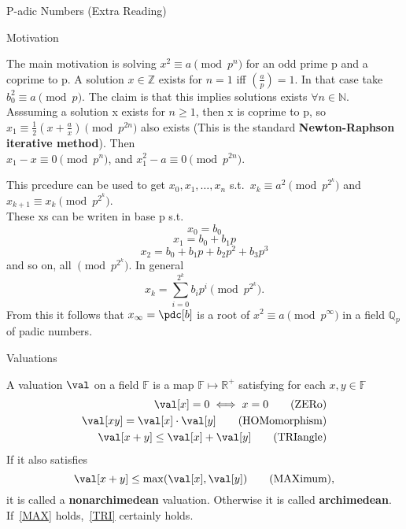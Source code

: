 \documentclass[12pt, letterpaper]{article}
\newcommand{\R}{\mathbb{R}}
\newcommand{\Q}{\mathbb{Q}}
\newcommand{\Z}{\mathbb{Z}}
\newcommand{\F}{\mathbb{F}}
\newcommand{\N}{\mathbb{N}}
\begin{document}
\newpage

\begin{section}{P-adic Numbers (Extra Reading)}

  \begin{subsection}{Motivation}

    The main motivation is solving \(x^{2} \equiv a \pmod{p^{n}}\) for an odd
    prime p and a coprime to p. A solution \(x \in \Z\) exists for \(n = 1\) iff
    \((\frac{a}{p}) = 1\). In that case take \(b^{2}_{0} \equiv a \pmod{p}\).
    The claim is that this implies solutions exists \(\forall n \in \N\). \\
    Asssuming a solution x exists for \(n \geq 1\), then x is coprime to p, so
    \(x_{1} \equiv \frac{1}{2} (x + \frac{a}{x}) \pmod{p^{2n}}\) also exists
    (This is the standard \textbf{Newton-Raphson iterative method}). Then \\
    \(x_{1} - x \equiv 0 \pmod{p^{n}}\), and \(x^{2}_{1} - a \equiv 0
    \pmod{p^{2n}}\).

    This prcedure can be used to get \(x_{0}, x_{1}, \dots , x_{n}\) s.t.\
    \(x_{k} \equiv a^{2} \pmod{p^{2^{k}}}\) and \(x_{k + 1} \equiv x_{k}
    \pmod{p^{2^{k}}}\). \\
    These xs can be writen in base p s.t.\
    \[x_{0} = b_{0}\] \[x_{1} = b_{0} + b_{1} p\]
    \[x_{2} = b_{0} + b_{1} p + b_{2} p^{2} + b_{3} p^{3}\]
    and so on, all \(\pmod{p^{2^{k}}}\). In general
    \[x_{k} = \sum^{2^{k}}_{i = 0} b_{i}p^{i} \pmod{p^{2^{k}}}.\]
    From this it follows that \(x_{\infty} = \pdc[b]\)
    is a root of \(x^{2} \equiv a \pmod{p^{\infty}}\) in a field \(\Q_{p}\) of
    padic numbers.

  \end{subsection}

  \begin{subsection}{Valuations}

    A valuation \(\val\) on a field \(\F\) is a map \(\F \mapsto \R^{+}\)
    satisfying for each \(x, y \in \F\)
    \begin{align*}
      \val[x] = 0 \iff x = 0 \tag{ZERo} \label{ZER} \\
      \val[xy] = \val[x] \cdot \val[y] \tag{HOMomorphism} \label{HOM} \\
      \val[x + y] \leq \val[x] + \val[y] \tag{TRIangle} \label{TRI}
    \end{align*}
    If it also satisfies \[\val[x + y] \leq \max(\val[x], \val[y]) \label{MAX}
      \tag{MAXimum},\] it is called a \textbf{nonarchimedean} valuation.
    Otherwise it is called \textbf{archimedean}. If~\ref{MAX} holds,~\ref{TRI}
    certainly holds.


\end{subsection}
\end{section}
\end{document}
